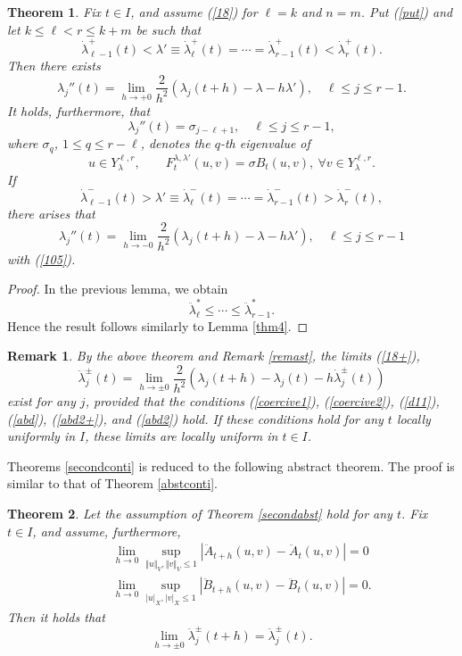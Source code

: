 \documentclass[final,a4paper]{jmsj}
\theoremstyle{thmstyleone}%
\newtheorem{theorem}{Theorem}
\theoremstyle{thmstyletwo}%
\newtheorem{remark}{Remark}%
\theoremstyle{thmstylethree}%
\begin{document}
\begin{theorem}\label{thm14} 
Fix $t\in I$, and assume (\ref{18}) for $\ell=k$ and $n=m$. Put (\ref{put}) and let $k\leq \ell<r\leq k+m$ be such that 
\begin{equation} 
\dot\lambda^+_{\ell-1}(t)<\lambda'\equiv \dot \lambda^+_{\ell}(t)=\cdots=\dot \lambda_{r-1}^+(t)<\dot \lambda_{r}^+(t).   
 \label{equal}
\end{equation} 
Then there exists 
\begin{equation} 
\lambda_j''(t)=\lim_{h\rightarrow +0}\frac{2}{h^2}(\lambda_j(t+h)-\lambda-h\lambda'), \quad \ell \leq j\leq r-1.  
 \label{bilateral}
\end{equation} 
It holds, furthermore, that 
\begin{equation} 
\lambda_j''(t)=\sigma_{j-\ell+1}, \quad \ell\leq j\leq r-1,  
 \label{105}
\end{equation} 
where $\sigma_q$, $1\leq q\leq r-\ell$, denotes the $q$-th eigenvalue of  
\[ u\in Y_\lambda^{\ell, r}, \qquad F_t^{\lambda, \lambda'}(u,v)=\sigma B_t(u,v), \ \forall v\in Y_\lambda^{\ell, r}. \] 
 If 
\[ \dot\lambda^-_{\ell-1}(t)>\lambda'\equiv \dot \lambda^-_{\ell}(t)=\cdots=\dot \lambda_{r-1}^-(t)>\dot \lambda_{r}^-(t),  \] 
there arises that  
\[ \lambda_j''(t)=\lim_{h\rightarrow -0}\frac{2}{h^2}(\lambda_j(t+h)-\lambda-h\lambda'), \quad \ell \leq j\leq r-1 \] 
with (\ref{105}).%
\end{theorem} 
\begin{proof} 
In the previous lemma, we obtain 
\[ \ddot \lambda_\ell^\ast\leq \cdots \leq \ddot \lambda_{r-1}^\ast. \] 
Hence the result follows similarly to Lemma \ref{thm4}.
\end{proof} 

\begin{remark}\label{uniform2}
By the above theorem and Remark \ref{remast}, the limits (\ref{18+}),  
\[ \ddot\lambda_j^\pm(t)=\lim_{h\rightarrow \pm 0}\frac{2}{h^2}(\lambda_j(t+h)-\lambda_j(t)-h\dot \lambda_j^\pm(t)) \] 
exist for any $j$, provided that the conditions (\ref{coercive1}), (\ref{coercive2}), (\ref{d11}), (\ref{abd}), (\ref{abd2+}), and (\ref{abd2}) hold. If these conditions hold for any $t$ locally uniformly in $I$, these limits are locally uniform in $t\in I$. 
\end{remark}


Theorems \ref{secondconti} is reduced to the following abstract theorem. The proof is similar to that of Theorem \ref{abstconti}.  

\begin{theorem}\label{thm25}
Let the assumption of Theorem \ref{secondabst} hold for any $t$. Fix $t\in I$, and assume, furthermore, 
\begin{eqnarray} 
& & \lim_{h\rightarrow 0}\sup_{\Vert u\Vert_V, \Vert v\Vert_V\leq 1}\left\vert \ddot A_{t+h}(u,v)-\ddot A_t(u,v)\right\vert=0 \nonumber\\ 
& & \lim_{h\rightarrow 0}\sup_{\vert u\vert_X, \vert v\vert_X\leq 1}\left\vert \ddot B_{t+h}(u,v)-\ddot B_t(u,v)\right\vert=0. 
 \label{abdot}
\end{eqnarray} 
Then it holds that 
\[ \lim_{h\rightarrow \pm 0}\ddot \lambda_j^\pm(t+h)=\ddot \lambda_j^\pm(t). \] 
\end{theorem}
\end{document}
